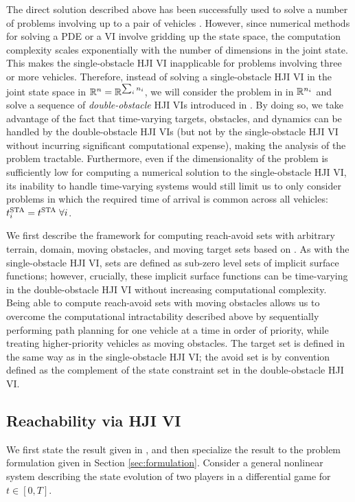 \documentclass[letterpaper, 10pt, conference]{ieeeconf}      %
\begin{document}
The direct solution described above has been successfully used to solve a number of problems involving up to a pair of vehicles \cite{mitchell05, ding08, huang11, chen14}. However, since numerical methods for solving a PDE or a VI involve gridding up the state space, the computation complexity scales exponentially with the number of dimensions in the joint state. This makes the single-obstacle HJI VI inapplicable for problems involving three or more vehicles. Therefore, instead of solving a single-obstacle HJI VI in the joint state space in $\mathbb{R}^n=\mathbb{R}^{\sum_i n_i}$, we will consider the problem in in $\mathbb{R}^{n_i}$ and solve a sequence of \textit{double-obstacle} HJI VIs introduced in \cite{fisac15}. By doing so, we take advantage of the fact that time-varying targets, obstacles, and dynamics can be handled by the double-obstacle HJI VIs (but not by the single-obstacle HJI VI without incurring significant computational expense), making the analysis of the problem tractable. Furthermore, even if the dimensionality of the problem is sufficiently low for computing a numerical solution to the single-obstacle HJI VI, its inability to handle time-varying systems would still limit us to only consider problems in which the required time of arrival is common across all vehicles: $t^{\text{STA}}_i = t^{\text{STA}} \;\forall i$.

We first describe the framework for computing reach-avoid sets with arbitrary terrain, domain, moving obstacles, and moving target sets based on \cite{fisac15}. As with the single-obstacle HJI VI, sets are defined as sub-zero level sets of implicit surface functions; however, crucially, these implicit surface functions can be time-varying in the double-obstacle HJI VI without increasing computational complexity. Being able to compute reach-avoid sets with moving obstacles allows us to overcome the computational intractability described above by sequentially performing path planning for one vehicle at a time in order of priority, while treating higher-priority vehicles as moving obstacles. The target set is defined in the same way as in the single-obstacle HJI VI; the avoid set is by convention defined as the complement of the state constraint set in the double-obstacle HJI VI.

\subsection{Reachability via HJI VI}
We first state the result given in \cite{fisac15}, and then specialize the result to the problem formulation given in Section \ref{sec:formulation}. Consider a general nonlinear system describing the state evolution of two players in a differential game for $t\in[0,T]$.
\end{document}

